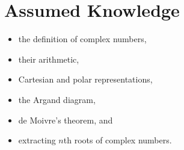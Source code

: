 \section{Assumed Knowledge}
\begin{itemize}
    \item the definition of complex numbers,
    \item their arithmetic,
    \item Cartesian and polar representations,
    \item the Argand diagram,
    \item de Moivre's theorem, and
    \item extracting \(n\)th roots of complex numbers.
\end{itemize}
